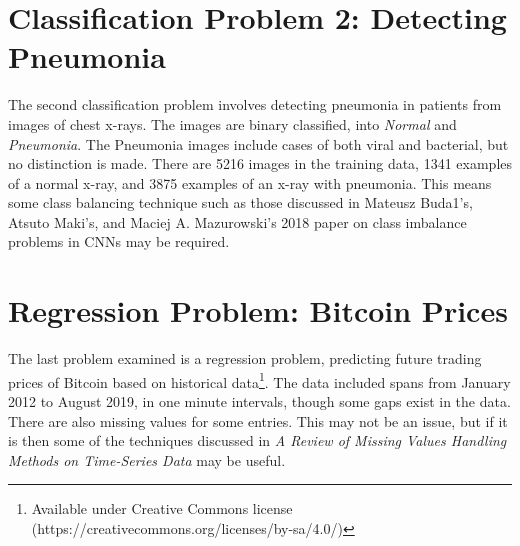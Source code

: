 \documentclass[12pt,a4paper,titlepage]{book}
\begin{document}
\section{Classification Problem 2: Detecting Pneumonia}
	The second classification problem involves detecting pneumonia in patients from images of chest x-rays\cite{pneumonia-dataset}. The images are binary classified, into \textit{Normal} and \textit{Pneumonia}. The Pneumonia images include cases of both viral and bacterial, but no distinction is made. There are 5216 images in the training data, 1341 examples of a normal x-ray, and 3875 examples of an x-ray with pneumonia. This means some class balancing technique such as those discussed in Mateusz Buda1's, Atsuto Maki's, and Maciej A. Mazurowski's 2018 paper on class imbalance problems in CNNs\cite{balancing-classes} may be required.
\section{Regression Problem: Bitcoin Prices}
	The last problem examined is a regression problem, predicting future trading prices of Bitcoin based on historical data\cite{bitcoin-dataset}\footnote{Available under Creative Commons license (https://creativecommons.org/licenses/by-sa/4.0/)}. The data included spans from January 2012 to August 2019, in one minute intervals, though some gaps exist in the data. There are also missing values for some entries. This may not be an issue, but if it is then some of the techniques discussed in \textit{A Review of Missing Values Handling Methods on Time-Series Data}\cite{missing-data} may be useful.
\end{document}
